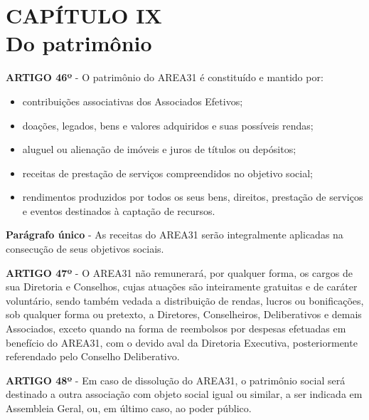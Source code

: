 \chapter*{CAPÍTULO IX \\ Do patrimônio}


\textbf{ARTIGO 46º} - O patrimônio do AREA31 é constituído e mantido por:

\begin{itemize}
	\item contribuições associativas dos Associados Efetivos;   
	\item doações, legados, bens e valores adquiridos e suas possíveis rendas;
	\item aluguel ou alienação de imóveis e juros de títulos ou depósitos;
	\item receitas de prestação de serviços compreendidos no objetivo social;
	\item rendimentos produzidos por todos os seus bens, direitos, prestação 
        de serviços e eventos destinados à captação de recursos.
\end{itemize}

\textbf{Parágrafo único} - As receitas do AREA31 serão integralmente 
aplicadas na consecução de seus objetivos sociais.

\bigskip

\textbf{ARTIGO 47º} - O AREA31 não remunerará, por qualquer forma, os cargos 
de sua Diretoria e Conselhos, cujas atuações são inteiramente gratuitas e 
de caráter voluntário, sendo também vedada a distribuição de rendas, 
lucros ou bonificações, sob qualquer forma ou pretexto, a Diretores, 
Conselheiros, Deliberativos e demais Associados, exceto quando na forma 
de reembolsos por despesas efetuadas em benefício do AREA31, com o 
devido aval da Diretoria Executiva, posteriormente 
referendado pelo Conselho Deliberativo.

\bigskip

\textbf{ARTIGO 48º} - Em caso de dissolução do AREA31, o patrimônio social 
será destinado a outra associação com objeto social igual ou similar, 
a ser indicada em Assembleia Geral, ou, em último caso, ao poder público.
